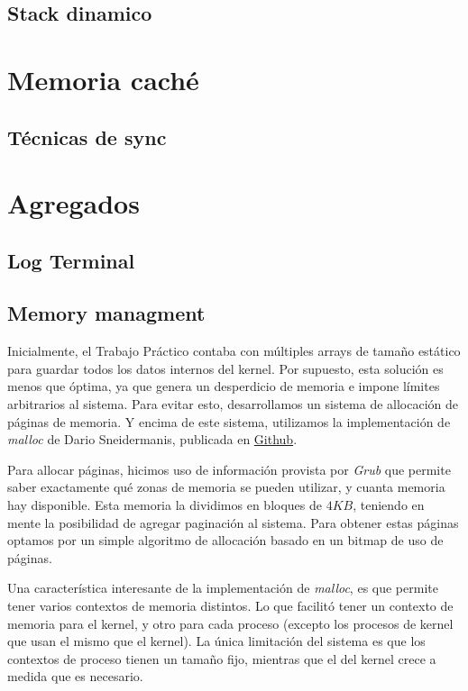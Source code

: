 \documentclass[a4paper,10pt]{article}
\begin{document}
\subsection{Stack dinamico}

\newpage

\section{Memoria caché}

\subsection{Técnicas de sync}

\newpage
\section{Agregados}

\subsection{Log Terminal}

\subsection{Memory managment}
Inicialmente, el Trabajo Práctico contaba con múltiples arrays de tamaño estático para guardar todos los datos internos del kernel.
Por supuesto, esta solución es menos que óptima, ya que genera un desperdicio de memoria e impone límites arbitrarios al sistema.
Para evitar esto, desarrollamos un sistema de allocación de páginas de memoria.
Y encima de este sistema, utilizamos la implementación de \textit{malloc} de Dario Sneidermanis, publicada en \href{https://github.com/esneider/malloc}{Github}.

Para allocar páginas, hicimos uso de información provista por \textit{Grub} que permite saber exactamente qué zonas de memoria se pueden utilizar, 
y cuanta memoria hay disponible.
Esta memoria la dividimos en bloques de $4KB$, teniendo en mente la posibilidad de agregar paginación al sistema.
Para obtener estas páginas optamos por un simple algoritmo de allocación basado en un bitmap de uso de páginas.

Una característica interesante de la implementación de \textit{malloc}, es que permite tener varios contextos de memoria distintos.
Lo que facilitó tener un contexto de memoria para el kernel, y otro para cada proceso (excepto los procesos de kernel que usan el mismo que el kernel).
La única limitación del sistema es que los contextos de proceso tienen un tamaño fijo, mientras que el del kernel crece a medida que es necesario.
\end{document}
